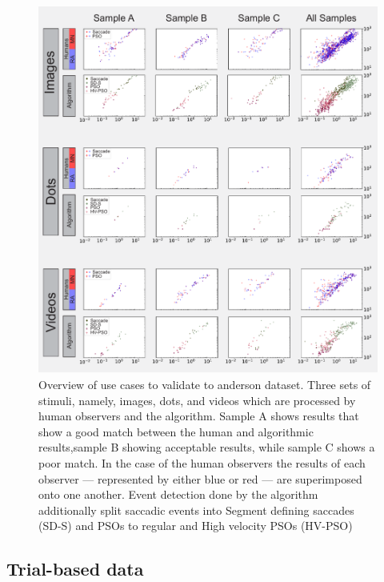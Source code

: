 \begin{figure}[!ht]
\centering
\includegraphics[width=1\textwidth]{Mainseqs_legends.pdf}
\caption{\label{fig:Mainseqs}Overview of use cases to validate to anderson dataset. Three sets of stimuli, namely, images, dots, and videos which are processed by human observers and the algorithm. Sample A shows results that show a good match between the human and algorithmic results,sample B showing acceptable results, while sample C shows a poor match. In the case of the human observers the results of each observer --- represented by either blue or red --- are superimposed onto one another. Event detection done by the algorithm additionally split saccadic events into Segment defining saccades (SD-S) and PSOs to regular and High velocity PSOs (HV-PSO)  }

\end{figure}
\subsection*{Trial-based data}






